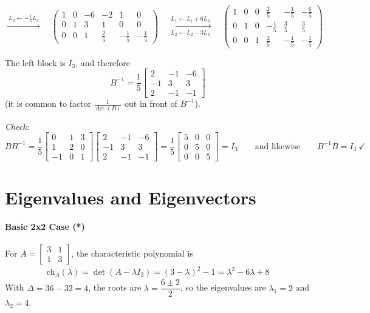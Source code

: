 \documentclass[]{article}
\begin{document}
	$$\xrightarrow{\ L_3 \leftarrow -\frac{1}{5} L_3 \ }\quad
	\left(\begin{array}{ccc|ccc}
		1 & 0 & -6 & -2 & 1 & 0\\
		0 & 1 & 3 & 1 & 0 & 0\\
		0 & 0 & 1 & \frac{2}{5} & -\frac{1}{5} & -\frac{1}{5}
	\end{array}\right)
	\quad \xrightarrow[\ L_2 \leftarrow L_2 - 3L_3 \ ]{\ L_1 \leftarrow L_1 + 6L_3 \ }\quad
	\left(\begin{array}{ccc|ccc}
		1 & 0 & 0 & \frac{2}{5} & -\frac{1}{5} & -\frac{6}{5}\\
		0 & 1 & 0 & -\frac{1}{5} & \frac{3}{5} & \frac{3}{5}\\
		0 & 0 & 1 & \frac{2}{5} & -\frac{1}{5} & -\frac{1}{5}
	\end{array}\right)$$

	The left block is $I_3$, and therefore
	$$B^{-1} = \frac{1}{5} \begin{bmatrix} 2 & -1 & -6 \\ -1 & 3 & 3 \\ 2 & -1 & -1 \end{bmatrix}$$
	(it is common to factor $\frac{1}{\det(B)}$ out in front of $B^{-1}$).

	\textit{Check:}
	$$B B^{-1} = \frac{1}{5} \begin{bmatrix} 0 & 1 & 3 \\ 1 & 2 & 0 \\ -1 & 0 & 1 \end{bmatrix} \begin{bmatrix} 2 & -1 & -6 \\ -1 & 3 & 3 \\ 2 & -1 & -1 \end{bmatrix}
	= \frac{1}{5} \begin{bmatrix} 5 & 0 & 0 \\ 0 & 5 & 0 \\ 0 & 0 & 5 \end{bmatrix} = I_3
	\qquad \text{and likewise} \qquad B^{-1} B = I_3 \ \checkmark$$


	\section{Eigenvalues and Eigenvectors}
	\paragraph{Basic 2x2 Case (*)}\mbox{}

	For $A = \begin{bmatrix} 3 & 1 \\ 1 & 3 \end{bmatrix}$, the characteristic polynomial is
	\begin{align*}
		\mathrm{ch}_A(\lambda) = \det\left(A - \lambda I_2\right) = (3 - \lambda)^2 - 1 = \lambda^2 - 6\lambda + 8
	\end{align*}
	With $\Delta = 36 - 32 = 4$, the roots are $\lambda = \dfrac{6 \pm 2}{2}$, so the eigenvalues are $\lambda_1 = 2$ and $\lambda_2 = 4$.
\end{document}
